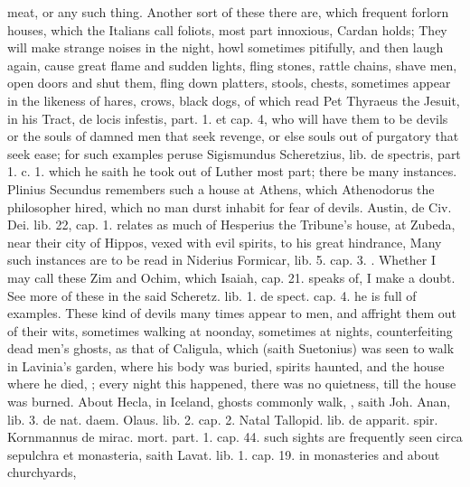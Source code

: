 {{meat, or any such thing. Another sort of these there are, which
frequent forlorn houses, which the Italians call foliots, most
part innoxious, Cardan holds; They will make strange noises in
the night, howl sometimes pitifully, and then laugh again, cause great
flame and sudden lights, fling stones, rattle chains, shave men, open
doors and shut them, fling down platters, stools, chests, sometimes
appear in the likeness of hares, crows, black dogs, \etc{} of which read
Pet Thyraeus the Jesuit, in his \textlatin{Tract, de locis infestis, part.
1. et cap. 4}, who will have them to be devils or the souls of damned
men that seek revenge, or else souls out of purgatory that seek ease;
for such examples peruse Sigismundus Scheretzius, \textlatin{lib. de
spectris, part 1. c. 1.} which he saith he took out of Luther most part;
there be many instances. Plinius Secundus remembers such a house
at Athens, which Athenodorus the philosopher hired, which no man durst
inhabit for fear of devils. Austin, \textlatin{de Civ. Dei. lib. 22, cap. 1.}
relates as much of Hesperius the Tribune's house, at Zubeda, near their
city of Hippos, vexed with evil spirits, to his great hindrance,  Many such instances are to be
read in Niderius Formicar, lib. 5. cap.  3. \etc{}. Whether I may call
these Zim and Ochim, which Isaiah, cap.  21. speaks of, I make a
doubt. See more of these in the said Scheretz. lib. 1. de spect. cap.
4. he is full of examples. These kind of devils many times appear to
men, and affright them out of their wits, sometimes walking at
noonday, sometimes at nights, counterfeiting dead men's ghosts,
as that of Caligula, which (saith Suetonius) was seen to walk in
Lavinia's garden, where his body was buried, spirits haunted, and the
house where he died, ; every night this happened, there was no quietness,
till the house was burned. About Hecla, in Iceland, ghosts commonly
walk, , saith Joh. Anan, lib. 3. de nat.
daem. Olaus. lib. 2. cap. 2. Natal Tallopid. lib. de apparit. spir.
Kornmannus de mirac. mort. part. 1. cap. 44. such sights are frequently
seen circa sepulchra et monasteria, saith Lavat. lib. 1. cap. 19. in
monasteries and about churchyards, }}
